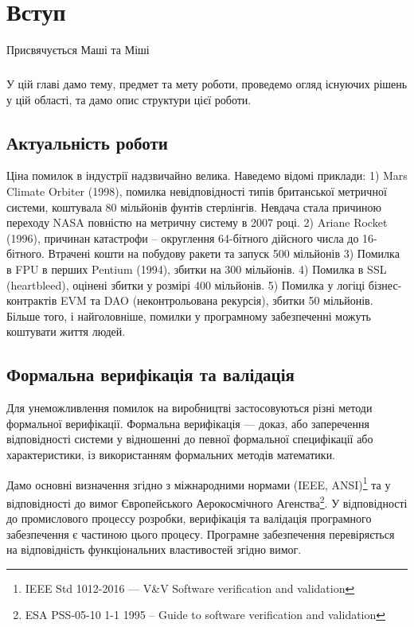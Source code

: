 \chapter{Вступ}

\epigraph{Присвячується Маші та Міші}{}

\paragraph{}
У цій главі дамо тему, предмет та мету роботи,
проведемо огляд існуючих рішень у цій області,
та дамо опис структури цієї роботи.

\section{Актуальність роботи}
Ціна помилок в індустрії надзвичайно велика. Наведемо
відомі приклади: 1) Mars Climate Orbiter (1998), помилка невідповідності
типів британської метричної системи, коштувала 80 мільйонів фунтів стерлінгів.
Невдача стала причиною переходу NASA повністю на метричну систему в 2007 році.
2) Ariane Rocket (1996), причинан катастрофи -- округлення 64-бітного дійсного
числа до 16-бітного. Втрачені кошти на побудову ракети та запуск 500 мільйонів
3) Помилка в FPU в перших Pentium (1994), збитки на 300 мільйонів.
4) Помилка в SSL (heartbleed), оцінені збитки у розмірі 400 мільйонів.
5) Помилка у логіці бізнес-контрактів EVM та
DAO (неконтрольована рекурсія), збитки 50 мільйонів.
Більше того, і найголовніше, помилки у програмному забезпеченні можуть
коштувати життя людей.

\section{Формальна верифікація та валідація}
Для унеможливлення помилок на виробництві застосовуються різні
методи формальної верифікації. Формальна верифікація — доказ, або заперечення
відповідності системи у відношенні до певної формальної специфікації або характеристики,
із використанням формальних методів математики.

Дамо основні визначення згідно з міжнародними нормами (IEEE, ANSI)\footnote{IEEE Std 1012-2016  --- V\&V Software verification and validation} та у відповідності до вимог
Європейського Аерокосмічного Агенства\footnote{ESA PSS-05-10 1-1 1995 -- Guide to software verification and validation}.
У відповідності до промислового процессу розробки, верифікація та валідація програмного
забезпечення є частиною цього процесу. Програмне забезпечення перевіряється на
відповідність функціональних властивостей згідно вимог.

